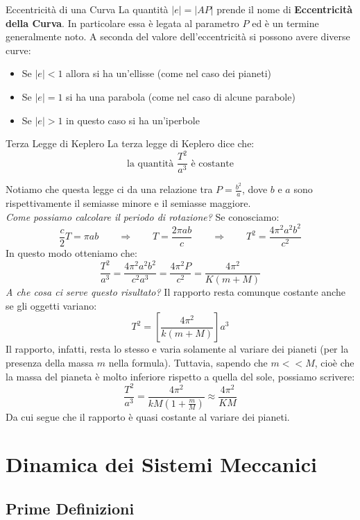 \documentclass[11pt,a4paper,twoside]{article}
\theoremstyle{definition}
\begin{document}
\begin{defn}{Eccentricità di una Curva}{}{}
	La quantità $|e| = |AP|$ prende il nome di \textbf{Eccentricità della Curva}. In particolare essa è legata al parametro $P$ ed è un termine generalmente noto.
	A seconda del valore dell'eccentricità si possono avere diverse curve:
	\begin{itemize}
		\item Se $|e|<1$ allora si ha un'ellisse (come nel caso dei pianeti)
		\item Se $|e|=1$ si ha una parabola (come nel caso di alcune parabole)
		\item Se $|e|>1$ in questo caso si ha un'iperbole
	\end{itemize}
\end{defn}

\begin{thm}{Terza Legge di Keplero}{}
	La terza legge di Keplero dice che:
	\[ \text{la quantità } \frac{T^2}{a^3} \text{ è costante} \]
\end{thm}

Notiamo che questa legge ci da una relazione tra $P = \frac {b^2}a$, dove $b$ e $a$ sono rispettivamente il semiasse minore e il semiasse maggiore.\\
\textit{Come possiamo calcolare il periodo di rotazione?} Se conosciamo:
\[ \frac c2 T = \pi ab \qquad \Rightarrow \qquad T = \frac{2 \pi ab}c \qquad \Rightarrow \qquad T^2 = \frac{4 \pi^2 a^2 b^2}{c^2} \]
In questo modo otteniamo che:
\[ \frac{T^2}{a^3} = \frac{4 \pi^2 a^2 b^2}{c^2 a^3} = \frac{4\pi^2 P}{c^2} = \frac{4 \pi^2}{K(m+M)} \]
\textit{A che cosa ci serve questo risultato?} Il rapporto resta comunque costante anche se gli oggetti variano:
\[ T^2 = \left[ \frac{4 \pi^2}{k(m+M)} \right] a^3\]
Il rapporto, infatti, resta lo stesso e varia solamente al variare dei pianeti (per la presenza della massa $m$ nella formula). Tuttavia, sapendo che $m<<M$, cioè che la massa del pianeta è molto inferiore rispetto a quella del sole, possiamo scrivere:
\[ \frac{T^2}{a^3} = \frac{4 \pi^2}{kM(1+\frac mM)} \approx \frac{4 \pi^2}{KM} \]
Da cui segue che il rapporto è quasi costante al variare dei pianeti.

\newpage

\section{Dinamica dei Sistemi Meccanici}

\subsection{Prime Definizioni}
\end{document}
